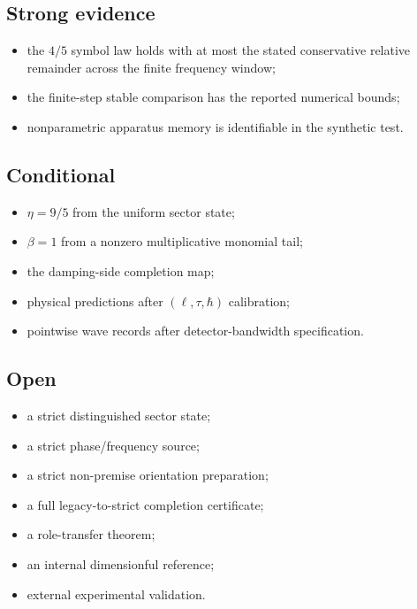 \documentclass[11pt,a4paper,openany]{report}
\begin{document}
\subsection{Strong evidence}

\begin{itemize}
\item 
the \(4/5\) symbol law holds with at most the stated conservative relative remainder across the finite frequency window;

\item 
the finite-step stable comparison has the reported numerical bounds;

\item 
nonparametric apparatus memory is identifiable in the synthetic test.

\end{itemize}

\subsection{Conditional}

\begin{itemize}
\item 
\(\eta=9/5\) from the uniform sector state;

\item 
\(\beta=1\) from a nonzero multiplicative monomial tail;

\item 
the damping-side completion map;

\item 
physical predictions after \((\ell,\tau,\hbar)\) calibration;

\item 
pointwise wave records after detector-bandwidth specification.

\end{itemize}

\subsection{Open}

\begin{itemize}
\item 
a strict distinguished sector state;

\item 
a strict phase/\allowbreak{}frequency source;

\item 
a strict non-premise orientation preparation;

\item 
a full legacy-to-strict completion certificate;

\item 
a role-transfer theorem;

\item 
an internal dimensionful reference;

\item 
external experimental validation.

\end{itemize}
\end{document}
